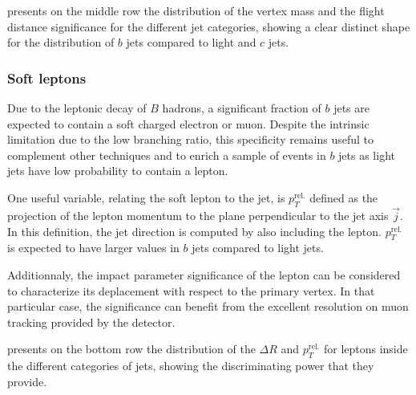      presents on the middle row the distribution of
    the vertex mass and the flight distance significance for the different jet categories,
    showing a clear distinct shape for the distribution of $b$ jets compared to light and
    $c$ jets.

    \subsubsection{Soft leptons}

    Due to the leptonic decay of $B$ hadrons, a significant fraction of $b$ jets are
    expected to contain a soft charged electron or muon. Despite the intrinsic limitation
    due to the low branching ratio, this specificity remains useful to complement other
    techniques and to enrich a sample of events in $b$ jets as light jets have low probability
    to contain a lepton.

    One useful variable, relating the soft lepton to the jet, is $p_T^\text{rel.}$ defined
    as the projection of the lepton momentum to the plane perpendicular to the jet axis
    $\vec{j}$. In this definition, the jet direction is computed by also including the lepton.
    $p_T^\text{rel.}$ is expected to have larger values in $b$ jets compared to light jets.

    Additionnaly, the impact parameter significance of the lepton can be considered to
    characterize its deplacement with respect to the primary vertex. In that particular
    case, the significance can benefit from the excellent resolution on muon tracking
    provided by the detector.

     presents on the bottom row the distribution of
    the $\Delta R$ and $p_T^\text{rel.}$ for leptons inside the different categories of
    jets, showing the discriminating power that they provide.

